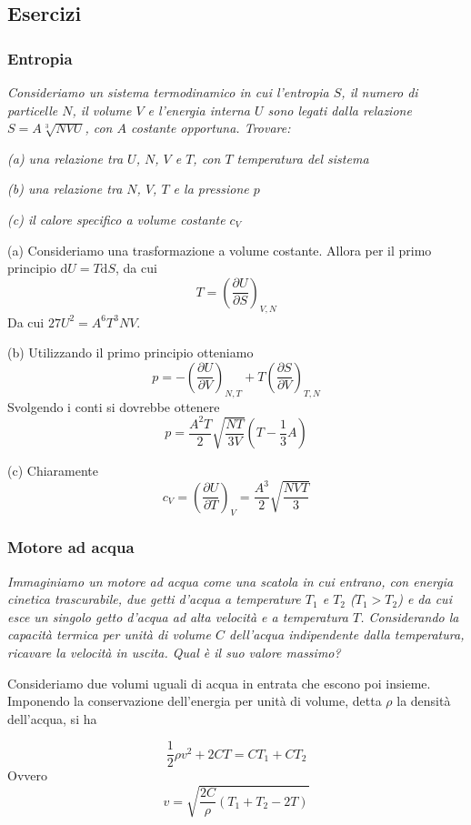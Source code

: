 \documentclass[a4paper,11pt]{article}
\begin{document}
\subsection{Esercizi}
\subsubsection{Entropia}
\textit{Consideriamo un sistema termodinamico in cui l'entropia $S$, il numero di particelle $N$, il volume $V$ e l'energia interna $U$ sono legati dalla relazione $S=A\sqrt[3]{NVU}$, con $A$ costante opportuna. Trovare:}

\noindent \textit{(a) una relazione tra $U$, $N$, $V$ e $T$, con $T$ temperatura del sistema}

\noindent \textit{(b) una relazione tra $N$, $V$, $T$ e la pressione $p$}

\noindent \textit{(c) il calore specifico a volume costante $c_V$}
\vspace{5mm}

\noindent (a) Consideriamo una trasformazione a volume costante. Allora per il primo principio $\mathrm{d}U=T\mathrm{d}S$, da cui
\[T=\left(\frac{\partial U}{\partial S}\right)_{V,N}\]
Da cui $27U^2=A^6T^3NV$.

\noindent (b) Utilizzando il primo principio otteniamo
\[p=-\left(\frac{\partial U}{\partial V}\right)_{N,T}+T\left(\frac{\partial S}{\partial V}\right)_{T,N}\]
Svolgendo i conti si dovrebbe ottenere
\[p=\frac{A^2T}{2}\sqrt{\frac{NT}{3V}}\left(T-\frac{1}{3}A\right)\]

\noindent (c) Chiaramente
\[c_V=\left(\frac{\partial U}{\partial T}\right)_{V}=\frac{A^3}{2}\sqrt{\frac{NVT}{3}}\]
\subsubsection{Motore ad acqua}
\textit{Immaginiamo un motore ad acqua come una scatola in cui entrano, con energia cinetica trascurabile, due getti d'acqua a temperature $T_1$ e $T_2$ ($T_1>T_2$) e da cui esce un singolo getto d'acqua ad alta velocità e a temperatura $T$. Considerando la capacità termica per unità di volume $C$ dell'acqua indipendente dalla temperatura, ricavare la velocità in uscita. Qual è il suo valore massimo?}

\noindent Consideriamo due volumi uguali di acqua in entrata che escono poi insieme. Imponendo la conservazione dell'energia per unità di volume, detta $\rho$ la densità dell'acqua, si ha

\[\frac{1}{2}\rho v^2+2CT=CT_1+CT_2\]
Ovvero
\[v=\sqrt{\frac{2C}{\rho}\left(T_1+T_2-2T\right)}\]
\end{document}
